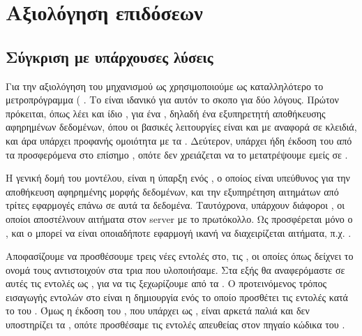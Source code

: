 \chapter{Αξιολόγηση επιδόσεων}

\section{Σύγκριση με υπάρχουσες  λύσεις}

Για την αξιολόγηση του μηχανισμού  ως 
χρησιμοποιούμε ως καταλληλότερο το μετροπρόγραμμα (
.
Το  είναι ιδανικό για αυτόν το σκοπο για δύο
λόγους. Πρώτον πρόκειται, όπως λέει και ίδιο \cite{redis}, για ένα
, δηλαδή ένα εξυπηρετητή αποθήκευσης αφηρημένων
δεδομένων, όπου οι βασικές λειτουργίες είναι  και 
με αναφορά σε κλειδιά, και άρα υπάρχει προφανής ομοιότητα
με τα . Δεύτερον, υπάρχει ήδη έκδοση 
του  από τα προσφερόμενα  στο επίσημο ,
οπότε δεν χρειάζεται να το μετατρέψουμε εμείς σε \cite{redisUni}.
\newline

Η γενική δομή του  μοντέλου, είναι η ύπαρξη ενός ,
ο οποίος είναι υπεύθυνος για την αποθήκευση αφηρημένης
μορφής δεδομένων, και την εξυπηρέτηση αιτημάτων από τρίτες
εφαρμογές επάνω σε αυτά τα δεδομένα. Ταυτόχρονα, υπάρχουν
διάφοροι , οι οποίοι αποστέλνουν αιτήματα
στον server με το  πρωτόκολλο. Ως 
προσφέρεται μόνο ο , και ο  μπορεί να
είναι οποιαδήποτε εφαρμογή ικανή να διαχειρίζεται  αιτήματα, π.χ. .
\newline

Αποφασίζουμε να προσθέσουμε τρεις νέες εντολές στο,
τις ,
οι οποίες όπως δείχνει το ονομά τους αντιστοιχούν
στα τρια  που υλοποιήσαμε. Στα εξής θα
αναφερόμαστε σε αυτές τις εντολές ως ,
για να τις ξεχωρίζουμε από τα . Ο προτεινόμενος
τρόπος εισαγωγής εντολών στο  είναι η δημιουργία
ενός  το οποίο προσθέτει τις εντολές κατά
το  του . Όμως η έκδοση του ,
που υπάρχει ως , είναι αρκετά παλιά και δεν
υποστηρίζει τα , οπότε προσθέσαμε τις εντολές απευθείας
στον πηγαίο κώδικα του .
\newline


